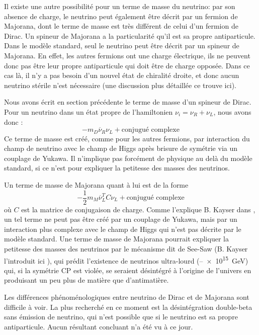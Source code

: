 	        Il existe une autre possibilité pour un terme de masse du neutrino: par son absence de charge, le neutrino peut également être décrit par un fermion de Majorana, dont le terme de masse est très différent de celui d'un fermion de Dirac. Un spineur de Majorana a la particularité qu'il est sa propre antiparticule. Dans le modèle standard, seul le neutrino peut être décrit par un spineur de Majorana. En effet, les autres fermions ont une charge électrique, ils ne peuvent donc pas être leur propre antiparticule qui doit être de charge opposée. Dans ce cas là, il n'y a pas besoin d'un nouvel état de chiralité droite, et donc aucun neutrino stérile n'est nécessaire (une discussion plus détaillée ce trouve ici\cite{Petcov2013}).
	        
	        Nous avons écrit en section précédente le terme de masse d'un spineur de Dirac. Pour un neutrino dans un état propre de l'hamiltonien $\nu_i=\nu_R+\nu_L$, nous avons donc : 
	        \begin{equation}
	        	-m_D\overline{\nu}_R \nu_L + \text{conjugué complexe}
	        \end{equation}
	        Ce terme de masse est créé, comme pour les autres fermions, par interaction du champ de neutrino avec le champ de Higgs après brisure de symétrie via un couplage de Yukawa. Il n'implique pas forcément de physique au delà du modèle standard, si ce n'est pour expliquer la petitesse des masses des neutrinos\cite{Perez2009}.
	        
	        Un terme de masse de Majorana quant à lui est de la forme
	        \begin{equation}\label{eq::majorana_mass}
	        -\frac{1}{2}m_M\overline{\nu}_L^T C \nu_L + \text{conjugué complexe}
	        \end{equation}
	        où $C$ est la matrice de conjugaison de charge. Comme l'explique B. Kayser dans \cite{Kayser2009}, un tel terme ne peut pas être créé par un couplage de Yukawa, mais par un interaction plus complexe avec le champ de Higgs qui n'est pas décrite par le modèle standard. Une terme de masse de Majorana pourrait expliquer la petitesse des masses des neutrinos par le mécanisme dit de See-Saw (B. Kayser l'introduit ici \cite{Kayser2005}), qui prédit l'existence de neutrinos ultra-lourd (--\SI{e15}{\giga\electronvolt}) qui, si la symétrie CP est violée, se seraient désintégré à l'origine de l'univers en produisant un peu plus de matière que d'antimatière.
	        
	        Les différences phénoménologiques entre neutrino de Dirac et de Majorana sont difficile à voir. La plus recherché en ce moment est la désintégration double-beta sans émission de neutrino, qui n'est possible que si le neutrino est sa propre antiparticule. Aucun résultant concluant n'a été vu à ce jour.
    
